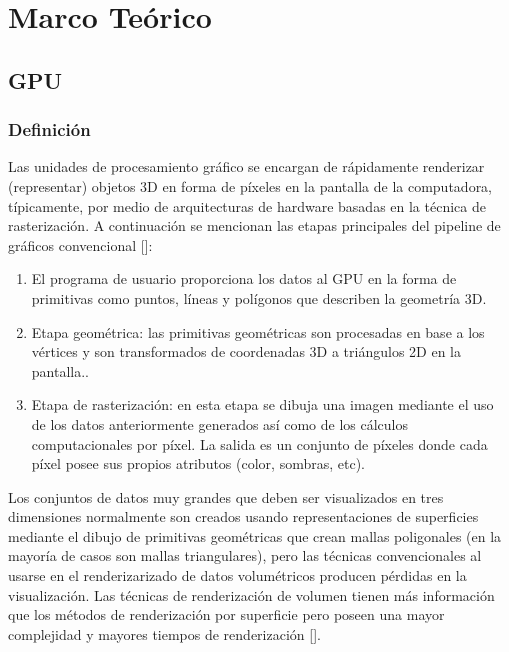 \chapter{Marco Teórico}%

\section{GPU}
\subsection{Definición}

Las unidades de procesamiento gráfico se encargan de rápidamente renderizar (representar) objetos 3D en forma de píxeles en la pantalla de la computadora, típicamente, por medio de arquitecturas de hardware basadas en la técnica de rasterización.
A continuación se mencionan las etapas principales del pipeline de gráficos convencional [\cite{Akenine2008}]:
\begin{enumerate}

\item El programa de usuario proporciona los datos al GPU en la forma de primitivas como puntos, líneas y polígonos que describen la geometría 3D. 
\item Etapa geométrica: las primitivas geométricas son procesadas en base a los vértices y son transformados de coordenadas 3D a triángulos 2D en la pantalla.. 
\item Etapa de rasterización: en esta etapa se dibuja una imagen mediante el uso de los datos anteriormente generados así como de los cálculos computacionales por píxel. La salida es un conjunto de píxeles donde cada píxel posee sus propios atributos (color, sombras, etc).  

\end{enumerate}

Los conjuntos de datos muy grandes que deben ser visualizados en tres dimensiones normalmente son creados usando representaciones de superficies mediante el dibujo de primitivas geométricas que crean mallas poligonales (en la mayoría de casos son mallas triangulares), pero las técnicas convencionales al usarse en el renderizarizado de datos volumétricos producen pérdidas en la visualización. Las técnicas de  renderización de volumen tienen más información que los métodos de renderización por superficie pero poseen una mayor complejidad y mayores tiempos de renderización [\cite{Akenine2008}].


